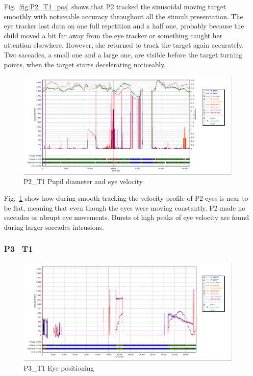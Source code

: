 Fig.~\ref{fig:P2_T1_pos} shows that P2 tracked the sinusoidal moving target smoothly with noticeable accuracy throughout all the stimuli presentation. The eye tracker lost data on one full repetition and a half one, probably because the child moved a bit far away from the eye tracker or something caught her attention elsewhere. However, she returned to track the target again accurately. Two saccades, a small one and a large one, are visible before the target turning points, when the target starts decelerating noticeably.

\begin{figure}[h]
  \centering
  \includegraphics[width=.8\textwidth]{figures/graphs/P2_T1(sinusoid)_VP.png}
  \caption[P2\_T1 Pupil size and velocity profile]{P2\_T1 Pupil diameter and eye velocity}
  \label{fig:P2_T1_vel}
\end{figure}

Fig.~\ref{fig:P2_T1_vel} show how during smooth tracking the velocity profile of P2 eyes is near to be flat, meaning that even though the eyes were moving constantly, P2 made no saccades or abrupt eye movements. Bursts of high peaks of eye velocity are found during larger saccades intrusions.



\subsubsection{P3\_T1}
\label{sec:P3_T1}

\begin{figure}[t]
  \centering
  \includegraphics[width=.8\textwidth]{figures/graphs/P3_T1(sinusoid)_XY.png}
  \caption[P3\_T1 Eye positioning]{P3\_T1 Eye positioning}
  \label{fig:P3_T1_pos}
\end{figure}

